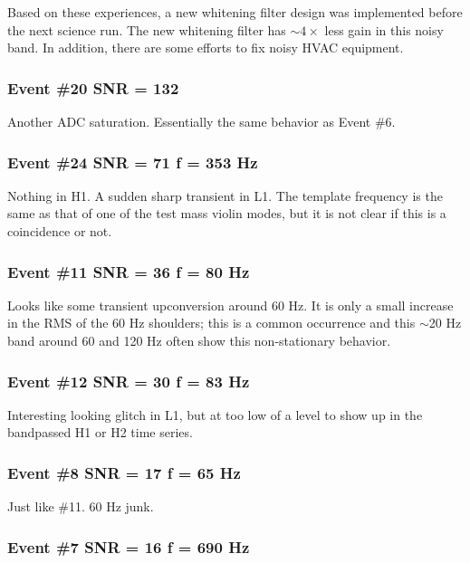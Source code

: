 Based on these experiences, a new whitening filter design was implemented before the
next science run. The new whitening filter has $\sim 4 \times$ less gain in this
noisy band. In addition, there are some efforts to fix noisy HVAC equipment.


\subsubsection{Event \#20   SNR = 132}

Another ADC saturation. Essentially the same behavior as Event \#6.


\subsubsection{Event \#24   SNR = 71   f = 353 Hz}

Nothing in H1. A sudden sharp transient in L1. The template frequency
is the same as that of one of the test mass violin modes, but it is not
clear if this is a coincidence or not.


\subsubsection{Event \#11   SNR = 36  f = 80 Hz}

Looks like some transient upconversion around 60 Hz. It is only a small
increase in the RMS of the 60 Hz shoulders; this is a common occurrence
and this $\sim$20 Hz band around 60 and 120 Hz often show this
non-stationary behavior.


\subsubsection{Event \#12   SNR = 30  f = 83 Hz}

Interesting looking glitch in L1, but at too low of a level to show up
in the bandpassed H1 or H2 time series.

\subsubsection{Event \#8   SNR = 17   f = 65 Hz}

Just like \#11. 60 Hz junk.


\subsubsection{Event \#7   SNR = 16   f = 690 Hz}

